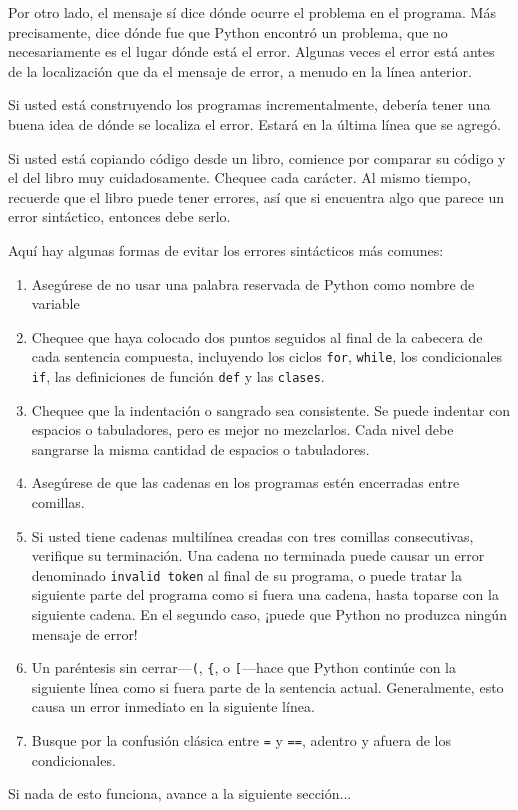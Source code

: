 Por otro lado, el mensaje sí dice dónde ocurre el problema en el programa.
Más precisamente, dice dónde fue que Python encontró un problema,
que no necesariamente es el lugar dónde está el error. Algunas veces
el error está antes de la localización que da el mensaje de error,
a menudo en la línea anterior.


Si usted está construyendo los programas incrementalmente, debería
tener una buena idea de dónde se localiza el error. Estará en la última
línea que se agregó.

Si usted está copiando código desde un libro, comience por comparar
su código y el del libro muy cuidadosamente. Chequee cada carácter.
Al mismo tiempo, recuerde que el libro puede tener errores, así que
si encuentra algo que parece un error sintáctico, entonces debe serlo.

Aquí hay algunas formas de evitar los errores sintácticos más comunes:

\begin{enumerate}
\item Asegúrese de no usar una palabra reservada de Python como nombre de
variable
\item Chequee que haya colocado dos puntos seguidos al final de la cabecera
de cada sentencia compuesta, incluyendo los ciclos \texttt{for}, \texttt{while},
los condicionales \texttt{if}, las definiciones de función \texttt{def}
y las \texttt{clases}.
\item Chequee que la indentación o sangrado sea consistente. Se puede indentar
con espacios o tabuladores, pero es mejor no mezclarlos. Cada nivel
debe sangrarse la misma cantidad de espacios o tabuladores.
\item Asegúrese de que las cadenas en los programas estén encerradas entre
comillas.
\item Si usted tiene cadenas multilínea creadas con tres comillas consecutivas,
verifique su terminación. Una cadena no terminada puede causar un
error denominado \texttt{invalid token} al final de su programa, o
puede tratar la siguiente parte del programa como si fuera una cadena,
hasta toparse con la siguiente cadena. En el segundo caso, ¡puede
que Python no produzca ningún mensaje de error!
\item Un paréntesis sin cerrar—\verb+(+, \verb+{+, o \verb+[+—hace que
Python continúe con la siguiente línea como si fuera parte de la sentencia
actual. Generalmente, esto causa un error inmediato en la siguiente
línea.
\item Busque por la confusión clásica entre \texttt{=} y \texttt{==}, adentro
y afuera de los condicionales.
\end{enumerate}
Si nada de esto funciona, avance a la siguiente sección...

